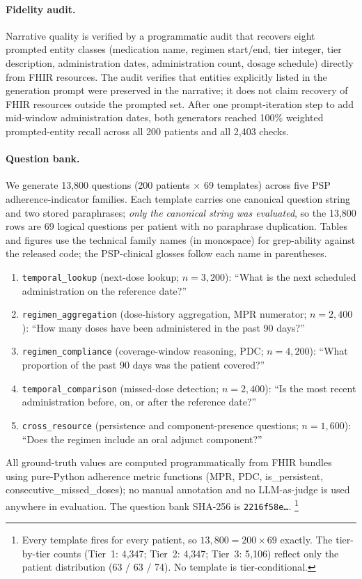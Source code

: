 \paragraph{Fidelity audit.}
Narrative quality is verified by a programmatic audit that recovers eight prompted entity
classes (medication name, regimen start/end, tier integer, tier description,
administration dates, administration count, dosage schedule) directly from FHIR
resources.  The audit verifies that entities explicitly listed in the generation prompt
were preserved in the narrative; it does not claim recovery of FHIR resources outside the
prompted set.  After one prompt-iteration step to add mid-window administration dates,
both generators reached 100\% weighted prompted-entity recall across all 200 patients and
all 2{,}403 checks.

\paragraph{Question bank.}
We generate 13,800 questions (200 patients $\times$ 69 templates) across five PSP
adherence-indicator families.  Each template carries one canonical question string and
two stored paraphrases; \emph{only the canonical string was evaluated}, so the 13,800
rows are 69 logical questions per patient with no paraphrase duplication.  Tables and
figures use the technical family names (in monospace) for grep-ability against the
released code; the PSP-clinical glosses follow each name in parentheses.
\begin{enumerate}
  \item \texttt{temporal\_lookup} (next-dose lookup; $n=3{,}200$):
    ``What is the next scheduled administration on the reference date?''
  \item \texttt{regimen\_aggregation} (dose-history aggregation, MPR numerator;
    $n=2{,}400$): ``How many doses have been administered in the past 90 days?''
  \item \texttt{regimen\_compliance} (coverage-window reasoning, PDC;
    $n=4{,}200$): ``What proportion of the past 90 days was the patient covered?''
  \item \texttt{temporal\_comparison} (missed-dose detection; $n=2{,}400$):
    ``Is the most recent administration before, on, or after the reference date?''
  \item \texttt{cross\_resource} (persistence and component-presence questions;
    $n=1{,}600$): ``Does the regimen include an oral adjunct component?''
\end{enumerate}
All ground-truth values are computed programmatically from FHIR bundles using pure-Python
adherence metric functions (MPR, PDC, is\_persistent, consecutive\_missed\_doses); no manual
annotation and no LLM-as-judge is used anywhere in evaluation.  The question bank SHA-256
is \texttt{2216f58e\ldots}.%
\footnote{Every template fires for every patient, so $13{,}800 = 200 \times 69$ exactly.
The tier-by-tier counts (Tier~1: 4{,}347; Tier~2: 4{,}347; Tier~3: 5{,}106) reflect only
the patient distribution (63 / 63 / 74).  No template is tier-conditional.}

